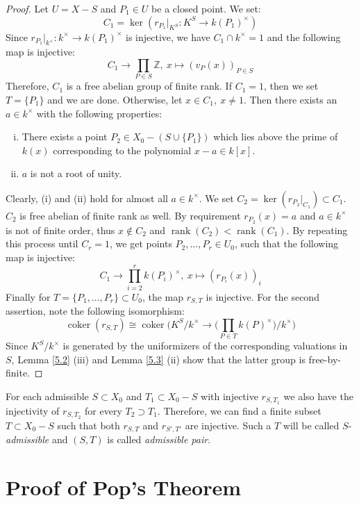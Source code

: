 \begin{proof}
Let $U = X -  S$ and $P_1\in U$ be a closed point. We set:
\[ C_1 = \ker(r_{P_1}|_{K^S}: K^S \to k(P_1)^\times) \]
Since $r_{P_1}|_{k^\times}:k^\times \to k(P_1)^\times$ is injective, we have $C_1\cap k^\times = 1$ and the following map is injective:
\[ C_1 \to\prod_{P\in S}\mathbb{Z},\ x \mapsto (v_P(x))_{P\in S} \]
Therefore, $C_1$ is a free abelian group of finite rank. If $C_1 = 1$, then we set $T = \{P_1\}$ and we are done. Otherwise, let $x\in C_1,\ x\neq 1$. Then there exists an $a\in k^\times$ with the following properties:
\begin{enumerate}[(i)]
\item There exists a point $P_2\in X_0 - (S\cup\{P_1\})$ which lies above the prime of $k(x)$ corresponding to the polynomial $x-a\in k[x]$.
\item $a$ is not a root of unity.
\end{enumerate}
Clearly, (i) and (ii) hold for almost all $a\in k^\times$. We set $C_2 = \ker(r_{P_2}|_{C_1})\subset C_1$. $C_2$ is free abelian of finite rank as well. By requirement $r_{P_2}(x)=a$ and $a\in k^\times$ is not of finite order, thus $x\not\in C_2$ and $\operatorname{rank}(C_2) < \operatorname{rank}(C_1)$. By repeating this process until $C_r=1$, we get points $P_2,\ldots,P_r\in U_0$, such that the following map is injective:
\[ C_1\to\prod_{i=2}^{r} k(P_i)^\times,\ x\mapsto(r_{P_i}(x))_i \]
Finally for $T=\{P_1,\ldots,P_r\}\subset U_0$, the map $r_{S,T}$ is injective. For the second assertion, note the following isomorphism:
\[ \operatorname{coker}(r_{S,T}) \cong\operatorname{coker}\Big(K^S/k^\times \to \Big(\prod_{P\in T}k(P)^\times \Big)\Big/k^\times \Big) \]
Since $K^S/k^\times$ is generated by the uniformizers of the corresponding valuations in $S$, Lemma \ref{5.2} (iii) and Lemma \ref{5.3} (ii) show that the latter group is free-by-finite.
\end{proof}

\begin{definition}
For each admissible $S\subset X_0$ and $T_1\subset X_0 -  S$ with injective $r_{S,T_1}$ we also have the injectivity of $r_{S,T_2}$ for every $T_2 \supset T_1$. Therefore,  we can find a finite subset $T\subset X_0 -  S$ such that both $r_{S,T}$ and $r_{S',T'}$ are injective. Such a $T$ will be called $S$-\textit{admissible} and $(S,T)$ is called \textit{admissible pair}.
\end{definition}

\section{Proof of Pop's Theorem}

